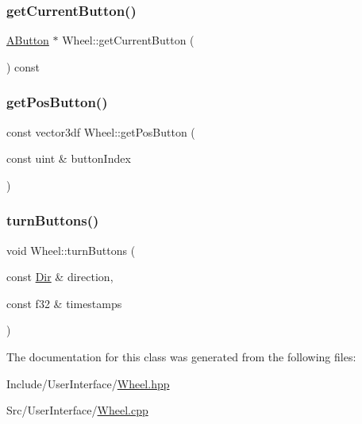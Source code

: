 \mbox{\label{class_wheel_a691db55aeb41d47eb065b5bffd0d8798}} 
\subsubsection{\texorpdfstring{getCurrentButton()}{getCurrentButton()}}
{\footnotesize\ttfamily \mbox{\hyperlink{class_a_button}{A\+Button}} $\ast$ Wheel\+::get\+Current\+Button (\begin{DoxyParamCaption}{ }\end{DoxyParamCaption}) const}

\mbox{\label{class_wheel_a7306c439e5da787bf3f1402216ecfc4b}} 
\subsubsection{\texorpdfstring{getPosButton()}{getPosButton()}}
{\footnotesize\ttfamily const vector3df Wheel\+::get\+Pos\+Button (\begin{DoxyParamCaption}\item[{const uint \&}]{button\+Index }\end{DoxyParamCaption})}

\mbox{\label{class_wheel_a925987839e4f1137b975cb43d49c6771}} 
\subsubsection{\texorpdfstring{turnButtons()}{turnButtons()}}
{\footnotesize\ttfamily void Wheel\+::turn\+Buttons (\begin{DoxyParamCaption}\item[{const \mbox{\hyperlink{class_wheel_ae7bd200dca893d41c3177b4c356dad6e}{Dir}} \&}]{direction,  }\item[{const f32 \&}]{timestamps }\end{DoxyParamCaption})}



The documentation for this class was generated from the following files\+:\begin{DoxyCompactItemize}
\item 
Include/\+User\+Interface/\mbox{\hyperlink{_wheel_8hpp}{Wheel.\+hpp}}\item 
Src/\+User\+Interface/\mbox{\hyperlink{_wheel_8cpp}{Wheel.\+cpp}}\end{DoxyCompactItemize}
